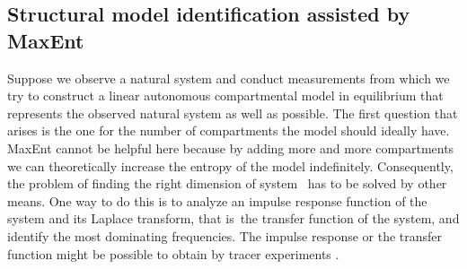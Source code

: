 \documentclass[smallextended]{svjour3}
\makeatletter
\renewcommand*{\eqref}[1]{%
  \hyperref[{#1}]{\textup{\tagform@{\ref*{#1}}}}%
}
\newcommand{\ie}{that is}
\makeatother
\begin{document}
\subsection{Structural model identification assisted by MaxEnt}
Suppose we observe a natural system and conduct measurements from which we try to construct a linear autonomous compartmental model in equilibrium that represents the observed natural system as well as possible.
The first question that arises is the one for the number of compartments the model should ideally have.
MaxEnt cannot be helpful here because by adding more and more compartments we can theoretically increase the entropy of the model indefinitely.
Consequently, the problem of finding the right dimension of system~\eqref{eqn:lin_CS_sys} has to be solved by other means.
One way to do this is to analyze an impulse response function of the system and its Laplace transform, \ie\ the transfer function of the system, and identify the most dominating frequencies.
The impulse response or the transfer function might be possible to obtain by tracer experiments \citep{Anderson1983, Walter1986MBS}.
\end{document}
